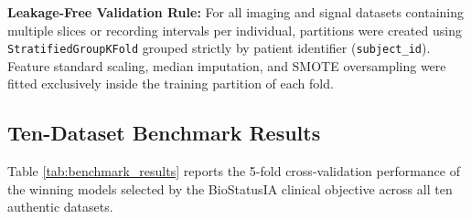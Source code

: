 \documentclass[conference]{IEEEtran}
\begin{document}
\textbf{Leakage-Free Validation Rule:} For all imaging and signal datasets containing multiple slices or recording intervals per individual, partitions were created using \texttt{StratifiedGroupKFold} grouped strictly by patient identifier (\texttt{subject\_id}). Feature standard scaling, median imputation, and SMOTE oversampling were fitted exclusively inside the training partition of each fold.

\subsection{Ten-Dataset Benchmark Results}
Table \ref{tab:benchmark_results} reports the 5-fold cross-validation performance of the winning models selected by the BioStatusIA clinical objective across all ten authentic datasets.
\end{document}
